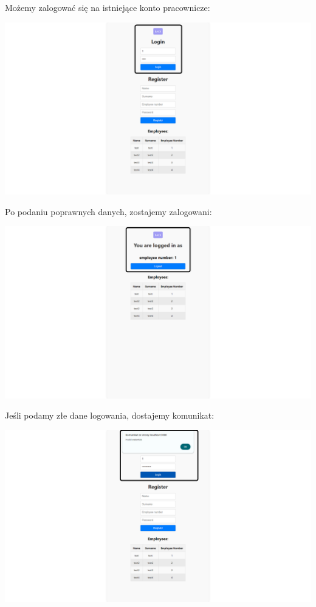 \documentclass[12pt]{article}
\begin{document}
\begin{minipage}{\textwidth}
\noindent Możemy zalogować się na istniejące konto pracownicze:
\begin{center}
\includegraphics[width=\textwidth]{media/Login_login.png}
\end{center}
\end{minipage}

\begin{minipage}{\textwidth}
\noindent Po podaniu poprawnych danych, zostajemy zalogowani:
\begin{center}
\includegraphics[width=\textwidth]{media/Login_successfull.png}
\end{center}
\end{minipage}

\begin{minipage}{\textwidth}
\noindent Jeśli podamy złe dane logowania, dostajemy komunikat:
\begin{center}
\includegraphics[width=\textwidth]{media/Login_invalidCredentials.png}
\end{center}
\end{minipage}
\end{document}
